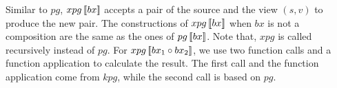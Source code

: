Similar to $pg$, $xpg \, [\![bx]\!]$ accepts a pair of the source and the view $(s,v)$ to produce the new pair. The constructions of $xpg \, [\![bx]\!]$ when $bx$ is not a composition are the same as the ones of $pg \, [\![bx]\!]$. Note that, $xpg$ is called recursively instead of $pg$. For $xpg \, [\![bx_1 \circ bx_2]\!]$, we use two function calls and a function application to calculate the result. The first call and the function application come from $kpg$, while the second call is based on $pg$.
